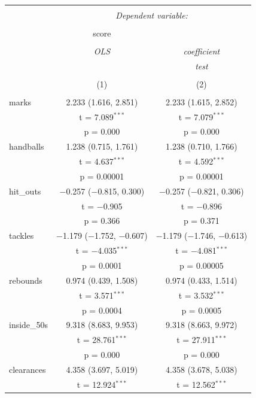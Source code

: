 \documentclass{article}
\begin{document}
\begin{table}[!htbp] \centering 
  \caption{} 
  \label{} 
\begin{tabular}{@{\extracolsep{5pt}}lcc} 
\\[-1.8ex]\hline 
\hline \\[-1.8ex] 
 & \multicolumn{2}{c}{\textit{Dependent variable:}} \\ 
\cline{2-3} 
\\[-1.8ex] & score &   \\ 
\\[-1.8ex] & \textit{OLS} & \textit{coefficient} \\ 
 & \textit{} & \textit{test} \\ 
\\[-1.8ex] & (1) & (2)\\ 
\hline \\[-1.8ex] 
 marks & 2.233 (1.616, 2.851) & 2.233 (1.615, 2.852) \\ 
  & t = 7.089$^{***}$ & t = 7.079$^{***}$ \\ 
  & p = 0.000 & p = 0.000 \\ 
  handballs & 1.238 (0.715, 1.761) & 1.238 (0.710, 1.766) \\ 
  & t = 4.637$^{***}$ & t = 4.592$^{***}$ \\ 
  & p = 0.00001 & p = 0.00001 \\ 
  hit\_outs & $-$0.257 ($-$0.815, 0.300) & $-$0.257 ($-$0.821, 0.306) \\ 
  & t = $-$0.905 & t = $-$0.896 \\ 
  & p = 0.366 & p = 0.371 \\ 
  tackles & $-$1.179 ($-$1.752, $-$0.607) & $-$1.179 ($-$1.746, $-$0.613) \\ 
  & t = $-$4.035$^{***}$ & t = $-$4.081$^{***}$ \\ 
  & p = 0.0001 & p = 0.00005 \\ 
  rebounds & 0.974 (0.439, 1.508) & 0.974 (0.433, 1.514) \\ 
  & t = 3.571$^{***}$ & t = 3.532$^{***}$ \\ 
  & p = 0.0004 & p = 0.0005 \\ 
  inside\_50s & 9.318 (8.683, 9.953) & 9.318 (8.663, 9.972) \\ 
  & t = 28.761$^{***}$ & t = 27.911$^{***}$ \\ 
  & p = 0.000 & p = 0.000 \\ 
  clearances & 4.358 (3.697, 5.019) & 4.358 (3.678, 5.038) \\ 
  & t = 12.924$^{***}$ & t = 12.562$^{***}$ \\ 

\end{tabular}
\end{table}
\end{document}
